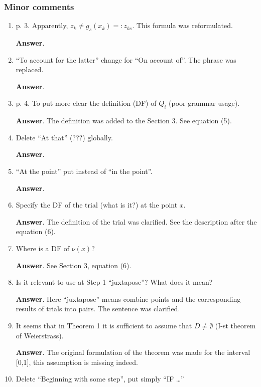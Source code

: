 \documentclass{article}%
\begin{document}
\subsubsection*{Minor comments}

\begin{enumerate}
\item p. 3. Apparently, $z_k\neq g_s(x_k ) =:z_{ks}$.
This formula was reformulated.

\textbf{Answer}.

\item  “To account for the latter” change for “On account of”.
The phrase was replaced.

\textbf{Answer}.

\item  p. 4. To put more clear the definition (DF) of $Q_i$ (poor grammar usage).

\textbf{Answer}.
The definition was added to the Section 3. See equation (5).

\item  Delete “At that” (???) globally.

\textbf{Answer}.

\item “At the point” put instead of “in the point”.

\textbf{Answer}.

\item  Specify the DF of the trial (what is it?) at the point $x$.

\textbf{Answer}.
The definition of the trial was clarified. See the description after the equation (6).

\item  Where is a DF of $\nu(x)$?

\textbf{Answer}.
See Section 3, equation (6).

\item  Is it relevant to use at Step 1 “juxtapose”? What does it mean?

\textbf{Answer}.
Here “juxtapose” means combine points and the corresponding results of trials into pairs.
The sentence was clarified.

\item  It seems that in Theorem 1 it is sufficient to assume that $D\neq\emptyset$ (I-st theorem of Weierstrass).

\textbf{Answer}.
The original formulation of the theorem was made for the interval [0,1], this assumption is missing indeed.

\item  Delete “Beginning with some step”, put simply “IF …”


\end{enumerate}
\end{document}
